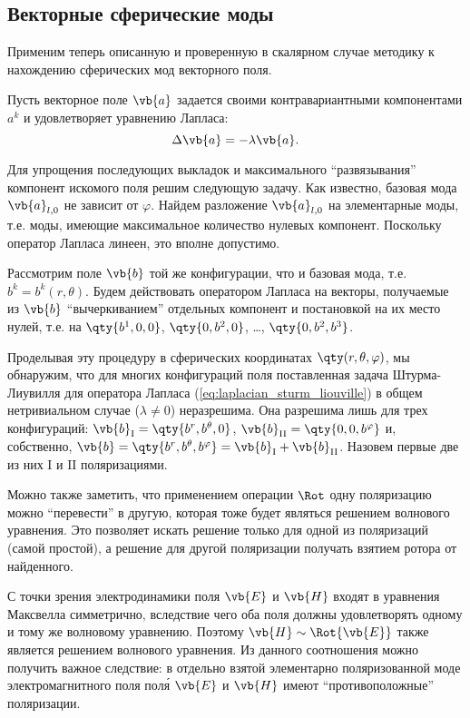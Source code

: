 \subsection{Векторные сферические моды}

    Применим теперь описанную и проверенную в скалярном случае методику к нахождению сферических мод векторного поля.

    Пусть векторное поле $\vb{a}$ задается своими контравариантными компонентами $a^k$ и удовлетворяет уравнению Лапласа:
    \begin{equation}\label{eq:laplacian_sturm_liouville}
        \Delta \vb{a} = - \lambda \vb{a} .
    \end{equation}

    Для упрощения последующих выкладок и максимального \enquote{развязывания} компонент искомого поля решим следующую задачу. Как известно, базовая мода $\vb{a}_{l,0}$ не зависит от $\varphi$. Найдем разложение $\vb{a}_{l,0}$ на элементарные моды, т.е. моды, имеющие максимальное количество нулевых компонент. Поскольку оператор Лапласа линеен, это вполне допустимо.

    Рассмотрим поле $\vb{b}$ той же конфигурации, что и базовая мода, т.е. $b^k = b^k(r,\theta)$. Будем действовать оператором Лапласа на векторы, получаемые из $\vb{b}$ \enquote{вычеркиванием} отдельных компонент и постановкой на их место нулей, т.е. на $\qty{ b^1, 0, 0 }$, $\qty{ 0, b^2, 0 }$, \dots, $\qty{ 0, b^2, b^3 }$.

    Проделывая эту процедуру в сферических координатах $\qty(r, \theta, \varphi)$, мы обнаружим, что для многих конфигураций поля поставленная задача Штурма-Лиувилля для оператора Лапласа (\autoref{eq:laplacian_sturm_liouville}) в общем нетривиальном случае ($\lambda \neq 0$) неразрешима. Она разрешима лишь для трех конфигураций: $\vb{b}_{\mathrm{I}} = \qty{ b^r, b^\theta, 0 }$, $\vb{b}_{\mathrm{II}} = \qty{ 0, 0, b^\varphi }$ и, собственно, $\vb{b} = \qty{ b^r, b^\theta, b^\varphi } = \vb{b}_{\mathrm{I}} + \vb{b}_{\mathrm{II}}$. Назовем первые две из них $\mathrm{I}$ и $\mathrm{II}$ поляризациями.

    Можно также заметить, что применением операции $\Rot$ одну поляризацию можно \enquote{перевести} в другую, которая тоже будет являться решением волнового уравнения. Это позволяет искать решение только для одной из поляризаций (самой простой), а решение для другой поляризации получать взятием ротора от найденного.

    С точки зрения электродинамики поля $\vb{E}$ и $\vb{H}$ входят в уравнения Максвелла симметрично, вследствие чего оба поля должны удовлетворять одному и тому же волновому уравнению. Поэтому $\vb{H} \sim \Rot{\vb{E}}$ также является решением волнового уравнения. Из данного соотношения можно получить важное следствие: в отдельно взятой элементарно поляризованной моде электромагнитного поля пол\'{я} $\vb{E}$ и $\vb{H}$ имеют \enquote{противоположные} поляризации.

